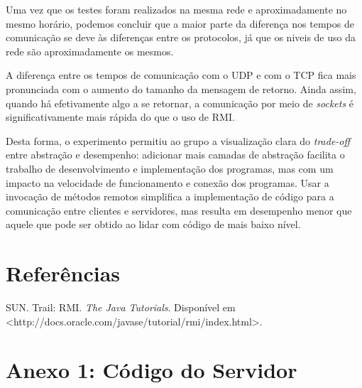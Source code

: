 \documentclass[11pt, brazil]{article} %
\begin{document}
Uma vez que os testes foram realizados na mesma rede e aproximadamente no mesmo horário, podemos concluir que a maior parte da diferença nos tempos de comunicação se deve às diferenças entre os protocolos, já que os niveis de uso da rede são aproximadamente os mesmos.

A diferença entre os tempos de comunicação com o UDP e com o TCP fica mais pronunciada com o aumento do tamanho da mensagem de retorno. Ainda assim, quando há efetivamente algo a se retornar, a comunicação por meio de \emph{sockets} é significativamente mais rápida do que o uso de RMI.

Desta forma, o experimento permitiu ao grupo a visualização clara do \emph{trade-off} entre abstração e desempenho: adicionar mais camadas de abstração facilita o trabalho de desenvolvimento e implementação dos programas, mas com um impacto na velocidade de funcionamento e conexão dos programas. Usar a invocação de métodos remotos simplifica a implementação de código para a comunicação entre clientes e servidores, mas resulta em desempenho menor que aquele que pode ser obtido ao lidar com código de mais baixo nível.


\section{Referências}

SUN. Trail: RMI. \emph{The Java Tutorials}. Disponível em <http://docs.oracle.com/javase/tutorial/rmi/index.html>.

\section*{Anexo 1: Código do Servidor}
\end{document}
